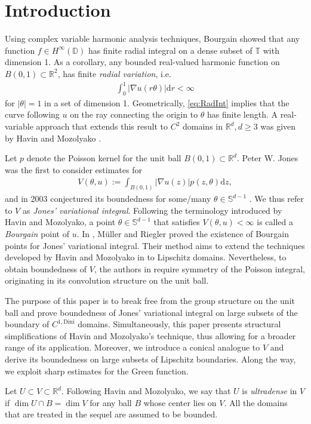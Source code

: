\documentclass[a4paper,12pt]{article}
\theoremstyle{definition}
\theoremstyle{definition}
\begin{document}
	\section{Introduction} 
	Using complex variable harmonic analysis techniques, Bourgain \cite{Bourgain931}\cite{Bourgain932} showed that any function $f\in H^\infty(\mathbb D)$ has finite radial integral on a dense subset of $\mathbb T$ with dimension 1. As a corollary, any bounded real-valued harmonic function on $B(0,1)\subset\mathbb R^2$, has finite \textit{radial variation}, i.e.
	\begin{align}\label{eq:RadInt}
		\int_0^1|\nabla u(r\theta)|\mathrm dr<\infty
	\end{align}
	for $|\theta|=1$ in a set of dimension 1. Geometrically, \eqref{eq:RadInt}  implies that the curve following $u$ on the ray connecting the origin to $\theta$ has finite length. A real-variable approach that extends this result to $C^2$ domains in $\mathbb{R}^d, d\geq 3$ was given by Havin and Mozolyako \cite{HavinMozol2016}.\par 
	Let $p$ denote the Poisson kernel for the unit ball $B(0,1)\subset\mathbb R^d$. Peter W. Jones was the first to consider estimates for
	\begin{align}\label{eq:FirstFullVarEstimate}
		V(\theta,u):=\int_{B(0,1)}|\nabla u(z)|p(z,\theta)\mathrm dz,
	\end{align}
	and in 2003 conjectured its boundedness for some/many  $\theta\in\mathbb S^{d-1}$ . We thus refer to $V$ as \textit{Jones' variational integral}. Following the terminology introduced by Havin and Mozolyako, a point $\theta\in\mathbb{S}^{d-1}$ that satisfies $V(\theta,u)<\infty$ is called a \textit{Bourgain} point of $u$. In \cite{MuellerRiegler20Bloch}, Müller and Riegler proved the existence of Bourgain points for Jones' variational integral.
	Their method aims to extend the techniques developed by Havin and Mozolyako in \cite{HavinMozol2016} to Lipschitz domains. Nevertheless, to obtain boundedness of $V$, the authors in \cite{MuellerRiegler20Bloch} require symmetry of the Poisson integral, originating in its convolution structure on the unit ball.\par
	
	The purpose of this paper is to break free from the group structure on the unit ball and prove boundedness of Jones' variational integral on large subsets of the boundary of $C^{1,\mathrm{Dini}}$ domains. Simultaneously, this paper presents structural simplifications of Havin and Mozolyako's technique, thus allowing for a broader range of its application. Moreover, we introduce a conical analogue to $V$ and derive its boundedness on large subsets of Lipschitz boundaries. Along the way, we exploit sharp estimates for the Green function.\par 
	Let $U\subset V\subset\mathbb R^d$. Following Havin and Mozolyako, we say that $U$ is \textit{ultradense} in $V$ if $\dim U\cap B=\dim V$ for any ball $B$ whose center lies on $V$. All the domains that are treated in the sequel are assumed to be bounded.
	
\end{document}
